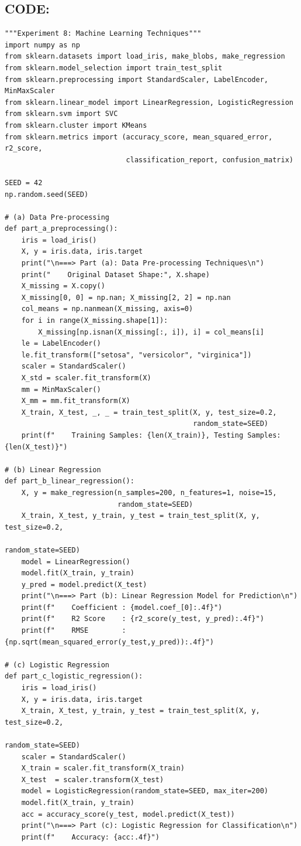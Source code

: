 \documentclass[12pt,a4paper]{article}
\begin{document}
\subsection{CODE:}

\begin{lstlisting}
"""Experiment 8: Machine Learning Techniques"""
import numpy as np
from sklearn.datasets import load_iris, make_blobs, make_regression
from sklearn.model_selection import train_test_split
from sklearn.preprocessing import StandardScaler, LabelEncoder, MinMaxScaler
from sklearn.linear_model import LinearRegression, LogisticRegression
from sklearn.svm import SVC
from sklearn.cluster import KMeans
from sklearn.metrics import (accuracy_score, mean_squared_error, r2_score,
                             classification_report, confusion_matrix)

SEED = 42
np.random.seed(SEED)

# (a) Data Pre-processing
def part_a_preprocessing():
    iris = load_iris()
    X, y = iris.data, iris.target
    print("\n===> Part (a): Data Pre-processing Techniques\n")
    print("    Original Dataset Shape:", X.shape)
    X_missing = X.copy()
    X_missing[0, 0] = np.nan; X_missing[2, 2] = np.nan
    col_means = np.nanmean(X_missing, axis=0)
    for i in range(X_missing.shape[1]):
        X_missing[np.isnan(X_missing[:, i]), i] = col_means[i]
    le = LabelEncoder()
    le.fit_transform(["setosa", "versicolor", "virginica"])
    scaler = StandardScaler()
    X_std = scaler.fit_transform(X)
    mm = MinMaxScaler()
    X_mm = mm.fit_transform(X)
    X_train, X_test, _, _ = train_test_split(X, y, test_size=0.2,
                                             random_state=SEED)
    print(f"    Training Samples: {len(X_train)}, Testing Samples: {len(X_test)}")

# (b) Linear Regression
def part_b_linear_regression():
    X, y = make_regression(n_samples=200, n_features=1, noise=15,
                           random_state=SEED)
    X_train, X_test, y_train, y_test = train_test_split(X, y, test_size=0.2,
                                                         random_state=SEED)
    model = LinearRegression()
    model.fit(X_train, y_train)
    y_pred = model.predict(X_test)
    print("\n===> Part (b): Linear Regression Model for Prediction\n")
    print(f"    Coefficient : {model.coef_[0]:.4f}")
    print(f"    R2 Score    : {r2_score(y_test, y_pred):.4f}")
    print(f"    RMSE        : {np.sqrt(mean_squared_error(y_test,y_pred)):.4f}")

# (c) Logistic Regression
def part_c_logistic_regression():
    iris = load_iris()
    X, y = iris.data, iris.target
    X_train, X_test, y_train, y_test = train_test_split(X, y, test_size=0.2,
                                                         random_state=SEED)
    scaler = StandardScaler()
    X_train = scaler.fit_transform(X_train)
    X_test  = scaler.transform(X_test)
    model = LogisticRegression(random_state=SEED, max_iter=200)
    model.fit(X_train, y_train)
    acc = accuracy_score(y_test, model.predict(X_test))
    print("\n===> Part (c): Logistic Regression for Classification\n")
    print(f"    Accuracy: {acc:.4f}")


\end{lstlisting}
\end{document}
